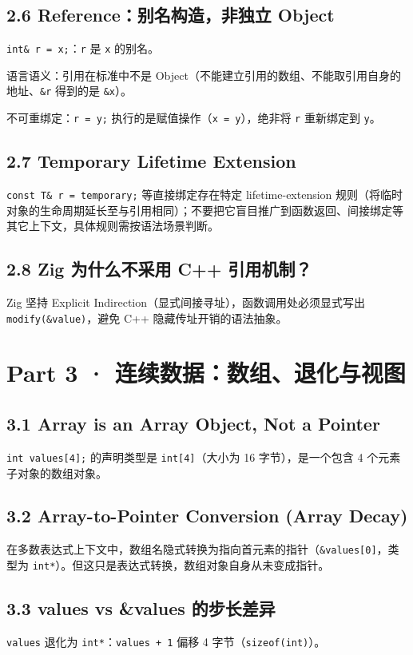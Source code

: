 \documentclass[11pt,a4paper]{article}
\begin{document}
\subsection{2.6 Reference：别名构造，非独立 Object}
\texttt{int\& r = x;}：\texttt{r} 是 \texttt{x} 的别名。

语言语义：引用在标准中不是 Object（不能建立引用的数组、不能取引用自身的地址、\texttt{\&r} 得到的是 \texttt{\&x}）。

不可重绑定：\texttt{r = y;} 执行的是赋值操作（\texttt{x = y}），绝非将 \texttt{r} 重新绑定到 \texttt{y}。

\subsection{2.7 Temporary Lifetime Extension}
\texttt{const T\& r = temporary;} 等直接绑定存在特定 lifetime-extension 规则（将临时对象的生命周期延长至与引用相同）；不要把它盲目推广到函数返回、间接绑定等其它上下文，具体规则需按语法场景判断。

\subsection{2.8 Zig 为什么不采用 C++ 引用机制？}
Zig 坚持 Explicit Indirection（显式间接寻址），函数调用处必须显式写出 \texttt{modify(\&value)}，避免 C++ 隐藏传址开销的语法抽象。

\section{Part 3 · 连续数据：数组、退化与视图}
\subsection{3.1 Array is an Array Object, Not a Pointer}
\texttt{int values[4];} 的声明类型是 \texttt{int[4]}（大小为 16 字节），是一个包含 4 个元素子对象的数组对象。

\subsection{3.2 Array-to-Pointer Conversion (Array Decay)}
在多数表达式上下文中，数组名隐式转换为指向首元素的指针（\texttt{\&values[0]}，类型为 \texttt{int*}）。但这只是表达式转换，数组对象自身从未变成指针。

\subsection{3.3 values vs \&values 的步长差异}
\texttt{values} 退化为 \texttt{int*}：\texttt{values + 1} 偏移 4 字节（\texttt{sizeof(int)}）。
\end{document}
